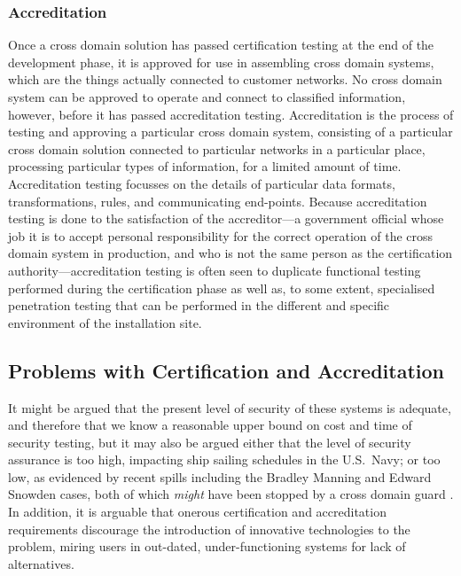 \documentclass[10pt,letterpaper,conference]{IEEEtran}
\begin{document}
\subsubsection{Accreditation}

Once a cross domain solution has passed certification testing at the end of the development
phase, it is approved for use in assembling cross domain systems, which are the things actually
connected to customer networks.  No cross
domain system can be approved to operate and connect to classified information, however, before
it has passed accreditation testing.  Accreditation is the process of testing and approving
a particular cross domain system, consisting of a particular cross domain solution connected to
particular networks in a particular place, processing particular types of information, for a
limited amount of time.  Accreditation testing focusses on the details of
particular data formats, transformations, rules, and communicating end-points.  Because
accreditation testing is done to the satisfaction of the accreditor---a government official whose
job it is to accept personal responsibility for the correct operation of the cross domain system in
production, and who is not the same person as the certification authority---accreditation testing
is often seen to duplicate functional testing performed during the certification phase as well as,
to some extent, specialised penetration testing that can be performed in the different and specific
environment of the installation site.

\subsection{Problems with Certification and Accreditation}

It might be argued that the present level of security of these systems is adequate, and therefore
that we know a reasonable upper bound on cost and time of security testing, but it may also be
argued either that the level of security assurance is too high, impacting ship sailing schedules
in the U.S.\ Navy; or too low, as evidenced by recent spills including the Bradley Manning and
Edward Snowden cases, both of which \emph{might} have been stopped by a cross domain guard
\cite[Ch.\ 1]{Loughry2012b}.  In addition, it is arguable that onerous certification and
accreditation requirements discourage the introduction of innovative technologies to the problem,
miring users in out-dated, under-functioning systems for lack of alternatives.
\end{document}
